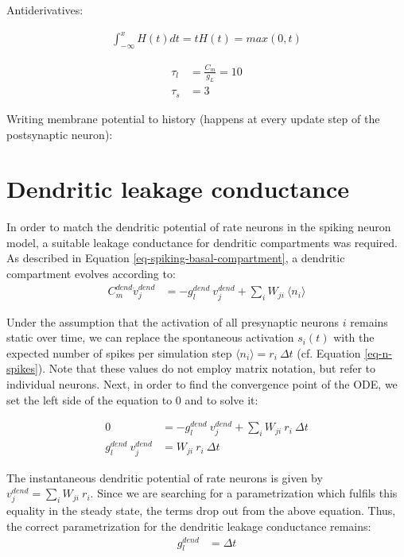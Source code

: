 Antiderivatives:

\begin{align}
  \int_{-\infty}^x H(t)dt = tH(t) = max(0,t)
\end{align}


\begin{align}
  \tau_l & = \frac{C_m}{g_L} = 10 \\
  \tau_s & = 3
\end{align}

Writing membrane potential to history (happens at every update step of the postsynaptic neuron):



\section{Dendritic leakage conductance}\label{sec-gl-dend}

In order to match the dendritic potential of rate neurons  in the spiking neuron model, a suitable leakage conductance
for dendritic compartments was required. As described in Equation \ref{eq-spiking-basal-compartment}, a dendritic
compartment evolves according to:
\begin{align}
  C_m^{dend} \dot{v}_j^{dend} & = -g_l^{dend} \  v_j^{dend} + \sum_i W_{ji} \    \langle \textit{n}_i \rangle
\end{align}

Under the assumption that the activation of all presynaptic neurons $i$ remains static over time, we can replace the
spontaneous activation $s_i(t)$ with the expected number of spikes per simulation step $\langle \textit{n}_i \rangle =
  r_i \ \Delta t$ (cf. Equation \ref{eq-n-spikes}). Note that these values do not employ matrix notation, but refer to
individual neurons. Next, in order to find the convergence point of the ODE, we set the left side of the equation to $0$
and to solve it:

\begin{align}
  0                        & = -g_l^{dend} \  v_j^{dend} + \sum_i W_{ji} \    r_i \ \Delta t \\
  g_l^{dend} \  v_j^{dend} & = W_{ji} \    r_i \ \Delta t
\end{align}

The instantaneous dendritic potential of rate neurons is given by $v_j^{dend} = \sum_i W_{ji} \ r_i$. Since we are
searching for a parametrization which fulfils this equality in the steady state, the terms drop out from the above
equation. Thus, the correct parametrization for the dendritic leakage conductance remains:
\begin{align}
  g_l^{dend} & = \Delta t
\end{align}

